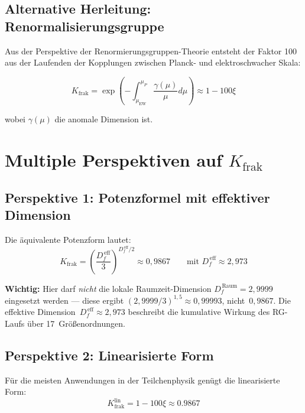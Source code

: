 	\subsection{Alternative Herleitung: Renormalisierungsgruppe}
	
	Aus der Perspektive der Renormierungsgruppen-Theorie entsteht der Faktor 100 aus der Laufenden der Kopplungen zwischen Planck- und elektroschwacher Skala:
	
	\begin{equation}
		K_{\text{frak}} = \exp\left(-\int_{\mu_{\text{EW}}}^{\mu_P} \frac{\gamma(\mu)}{\mu} d\mu\right) \approx 1 - 100\xi
	\end{equation}
	
	wobei $\gamma(\mu)$ die anomale Dimension ist.
	
	\section{Multiple Perspektiven auf $K_{\text{frak}}$}
	
	\subsection{Perspektive 1: Potenzformel mit effektiver Dimension}
	
	Die äquivalente Potenzform lautet:
	\begin{equation}
		K_{\text{frak}} = \left(\frac{D_f^{\,\text{eff}}}{3}\right)^{D_f^{\,\text{eff}}/2} \approx 0{,}9867 \qquad \text{mit } D_f^{\,\text{eff}} \approx 2{,}973
		\label{eq:exact_kfrak}
	\end{equation}
	
	\textbf{Wichtig:} Hier darf \emph{nicht} die lokale Raumzeit-Dimension $D_f^{\,\text{Raum}} = 2{,}9999$ eingesetzt werden --- diese ergibt $(2{,}9999/3)^{1{,}5} \approx 0{,}99993$, nicht~$0{,}9867$. Die effektive Dimension~$D_f^{\,\text{eff}} \approx 2{,}973$ beschreibt die kumulative Wirkung des RG-Laufs über 17~Größenordnungen.
	
	\subsection{Perspektive 2: Linearisierte Form}
	
	Für die meisten Anwendungen in der Teilchenphysik genügt die linearisierte Form:
	\begin{equation}
		K_{\text{frak}}^{\text{lin}} = 1 - 100\xi \approx 0.9867
		\label{eq:linear_kfrak}
	\end{equation}
	
